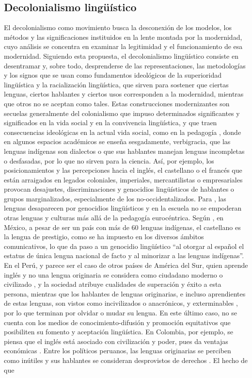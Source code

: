 \documentclass[spanish]{textolivre}
\begin{document}
\subsection{Decolonialismo lingüístico}
El decolonialismo como movimiento busca la desconexión de los modelos, los métodos y las significaciones instituidos en la lente montada por la modernidad, cuyo análisis se concentra en examinar la legitimidad y el funcionamiento de esa modernidad. Siguiendo esta propuesta, el decolonialismo lingüístico consiste en desentramar y, sobre todo, desprenderse de las representaciones, las metodologías y los signos que se usan como fundamentos ideológicos de la superioridad lingüística y la racialización lingüística, que sirven para sostener que ciertas lenguas, ciertos hablantes y ciertos usos corresponden a la modernidad, mientras que otros no se aceptan como tales. Estas construcciones modernizantes son secuelas generalmente del colonialismo que impuso determinados significantes y significados en la vida social y en la convivencia lingüística, y que traen consecuencias ideológicas en la actual vida social, como en la pedagogía \cite{baum2019decir}, donde en algunos espacios académicos se enseña sesgadamente, verbigracia, que las lenguas indígenas son dialectos o que sus hablantes manejan lenguas incompletas o desfasadas, por lo que no sirven para la ciencia. Así, por ejemplo, los posicionamientos y las percepciones hacia el inglés, el castellano o el francés que están arraigados en legados coloniales, imperiales, mercantilistas o empresariales provocan desajustes, discriminaciones y genocidios lingüísticos de hablantes o grupos marginalizados, especialmente de los no-occidentalizados. Para \textcite{skutnabb-kangas_linguistic_2000}, las lenguas desaparecen por genocidios lingüísticos y en la escuela no se empoderan otras lenguas y culturas más allá de la pedagogía eurocéntrica. Según \textcite[p.2]{despagne__ideologias_2021}, en México, a pesar de ser un país con más de 60 lenguas indígenas, el castellano es la lengua de prestigio, como se ha impuesto en los diversos ámbitos comunicativos, lo que da paso a un genocidio lingüístico “al otorgar al español el estatus de única lengua nacional de facto y al minorizar a las lenguas indígenas”. En el Perú, y parece ser el caso de otros países de América del Sur, quien aprende inglés y no una lengua originaria se considera como ciudadano moderno o civilizado \cite{gutierrez_english_2022}, y la sociedad atribuye cualidades de superación y éxito a esta persona, mientras que los hablantes de lenguas originarias, e incluso aprendientes de estas lenguas, son vistos como incivilizados o anacrónicos, y exterminables \cite{bartolome_pobladores_2004, harambour_barbarie_2019}, por lo que terminan por olvidar o mudar su lengua. En este último caso, no se cuenta con los medios de conocimiento-difusión y promoción equitativos que posibiliten su fomento y aceptación lingüística. En Colombia, por ejemplo, se piensa que el inglés está asociado con civilización y poder, pues da ventajas económicas \cite{guerrero2010english}. Entre los políticos peruanos, las lenguas originarias se perciben como inútiles y sus hablantes se consideran desprovistos de derechos \cite{lovon-cueva_compuestos_2021}. El hecho de que 
\end{document}
